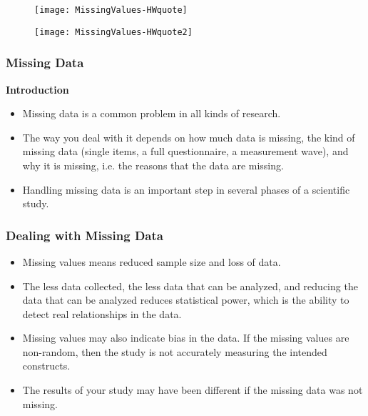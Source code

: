 \documentclass[MASTER.tex]{subfiles}
\begin{document}
\begin{frame}


\begin{figure}
\centering
\texttt{[image: MissingValues-HWquote]}
\end{figure}

\end{frame}
\begin{frame}
	\begin{figure}
\centering
\texttt{[image: MissingValues-HWquote2]}
\end{figure}

	\end{frame}
\begin{frame}[fragile]
		\frametitle{Missing Data}
		\Large
	\noindent \textbf{Introduction}
		\begin{itemize}
\item 	Missing data is a common problem in all kinds of research. 
\item The way you deal with it depends on how
		much data is missing, the kind of missing data (single items, a full questionnaire, a measurement
		wave), and why it is missing, i.e. the reasons that the data are missing.
\item  Handling missing data is an
		important step in several phases of a scientific study.
		\end{itemize}

		
	\end{frame}
	\begin{frame}
		\Large
		\frametitle{Dealing with Missing Data}
		\begin{itemize}
			\item 		Missing values means reduced sample size and loss of data. 
			
			\item 		The less data collected, the less data that can be analyzed, and reducing the data that can be analyzed reduces statistical power, which is the ability to detect real relationships in the data.
			\item  Missing values may also indicate bias in the data. If the missing values are non-random, then the study is not accurately measuring the intended constructs. 
			\item The results of your study may have been different if the missing data was not missing.
		\end{itemize}		
		
	\end{frame}
\end{document}
